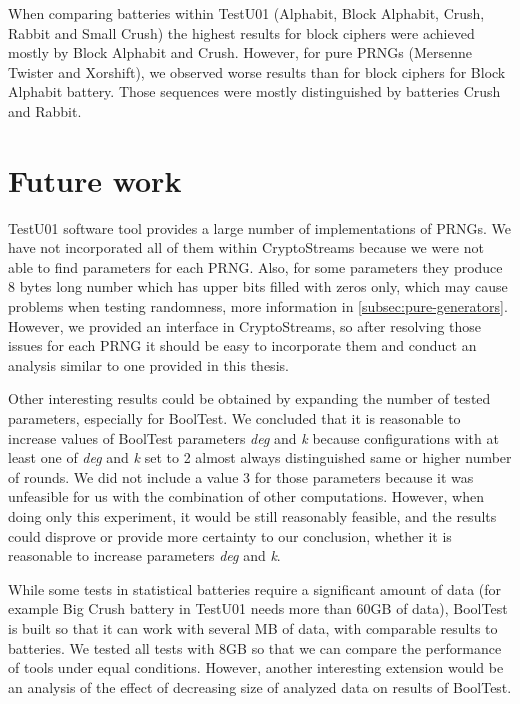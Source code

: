 \documentclass[
    digital,    %
    oneside,    %
    color,
    11pt,
    nocover,
    notable,
    nolof,
    nolot,
    final
]{fithesis3}
\renewcommand\_{\textunderscore\allowbreak}
\begin{document}
When comparing batteries within TestU01 (Alphabit, Block Alphabit, Crush, Rabbit and Small Crush) the highest results for block ciphers were achieved mostly by Block Alphabit and Crush. However, for pure PRNGs (Mersenne Twister and Xorshift), we observed worse results than for block ciphers for Block Alphabit battery. Those sequences were mostly distinguished by batteries Crush and Rabbit.

\section{Future work}

TestU01 software tool provides a large number of implementations of PRNGs. We have not incorporated all of them within CryptoStreams because we were not able to find parameters for each PRNG. Also, for some parameters they produce 8 bytes long number which has upper bits filled with zeros only, which may cause problems when testing randomness, more information in \cref{subsec:pure-generators}. However, we provided an interface in CryptoStreams, so after resolving those issues for each PRNG it should be easy to incorporate them and conduct an analysis similar to one provided in this thesis.

Other interesting results could be obtained by expanding the number of tested parameters, especially for BoolTest. We concluded that it is reasonable to increase values of BoolTest parameters \textit{deg} and \textit{k} because configurations with at least one of \textit{deg} and \textit{k} set to 2 almost always distinguished same or higher number of rounds. We did not include a value 3 for those parameters because it was unfeasible for us with the combination of other computations. However, when doing only this experiment, it would be still reasonably feasible, and the results could disprove or provide more certainty to our conclusion, whether it is reasonable to increase parameters \textit{deg} and \textit{k}.

While some tests in statistical batteries require a significant amount of data (for example Big Crush battery in TestU01 needs more than 60GB of data), BoolTest is built so that it can work with several MB of data, with comparable results to batteries. We tested all tests with 8GB so that we can compare the performance of tools under equal conditions. However, another interesting extension would be an analysis of the effect of decreasing size of analyzed data on results of BoolTest.


\end{document}
